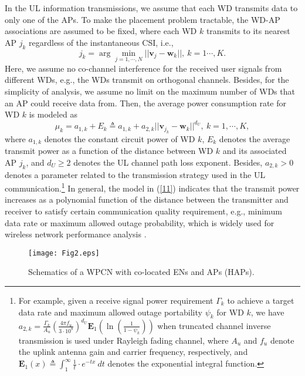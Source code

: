 \documentclass[journal, draftcls, one column, 12pt]{IEEEtran}
\begin{document}
In the UL information transmissions, we assume that each WD transmits data to only one of the APs. To make the placement problem tractable, the WD-AP associations are assumed to be fixed, where each WD $k$ transmits to its nearest AP $j_k$ regardless of the instantaneous CSI, i.e.,
\begin{equation}
\label{22}
j_k = \arg \min_{j=1,\cdots,N} ||\mathbf{v}_j - \mathbf{w}_k||,\ k=1\cdots,K.
\end{equation}
Here, we assume no co-channel interference for the received user signals from different WDs, e.g., the WDs transmit on orthogonal channels. Besides, for the simplicity of analysis, we assume no limit on the maximum number of WDs that an AP could receive data from. Then, the average power consumption rate for WD $k$ is modeled as
\begin{equation}
\label{11}
\mu_k = a_{1,k} + E_{k} \triangleq a_{1,k} + a_{2,k} ||\mathbf{v}_{j_k} - \mathbf{w}_k||^{d_U}, \ k=1,\cdots,K,
\end{equation}
where $a_{1,k}$ denotes the constant circuit power of WD $k$, $E_{k}$ denotes the average transmit power as a function of the distance between WD $k$ and its associated AP $j_k$, and $d_U\geq 2$ denotes the UL channel path loss exponent. Besides, $a_{2,k}>0$ denotes a parameter related to the transmission strategy used in the UL communication.\footnote{For example, given a receive signal power requirement $\Gamma_k$ to achieve a target data rate and maximum allowed outage portability $\psi_k$ for WD $k$, we have $a_{2,k}= \frac{\Gamma_k}{A_u}\left(\frac{4\pi f_u}{3\cdot 10^8}\right)^{d_U}\mathbf{E}_1\left(\ln\left(\frac{1}{1- \psi_k}\right)\right)$ when truncated channel inverse transmission \cite{2005:Goldsmith} is used under Rayleigh fading channel, where $A_u$ and $f_u$ denote the uplink antenna gain and carrier frequency, respectively, and $\mathbf{E}_1(x) \triangleq \int_{1}^{\infty} \frac{1}{t} \cdot e^{-t x }\  dt$ denotes the exponential integral function.} In general, the model in (\ref{11}) indicates that the transmit power increases as a polynomial function of the distance between the transmitter and receiver to satisfy certain communication quality requirement, e.g., minimum data rate or maximum allowed outage probability, which is widely used for wireless network performance analysis \cite{2005:Hou,2007:Liu}.

\begin{figure}
\centering
  \begin{center}
    \texttt{[image: Fig2.eps]}
  \end{center}
  \caption{Schematics of a WPCN with co-located ENs and APs (HAPs).}
  \label{62}
  \vspace{-5ex}
\end{figure}
\end{document}
